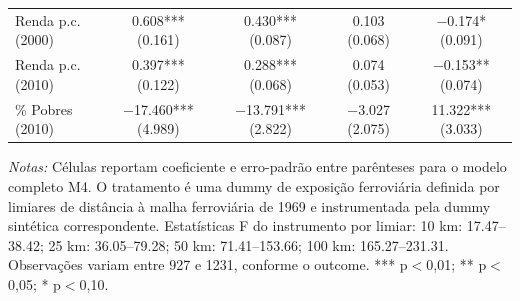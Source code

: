 \documentclass[12pt,a4paper]{article}
\begin{document}
\begin{table}[!htbp]
{\begin{tabular}{lcccc}
Renda p.c. (2000) & \num{0.608}*** (\num{0.161}) & \num{0.430}*** (\num{0.087}) & \num{0.103} (\num{0.068}) & \num{-0.174}* (\num{0.091}) \\
Renda p.c. (2010) & \num{0.397}*** (\num{0.122}) & \num{0.288}*** (\num{0.068}) & \num{0.074} (\num{0.053}) & \num{-0.153}** (\num{0.074}) \\
\% Pobres (2010) & \num{-17.460}*** (\num{4.989}) & \num{-13.791}*** (\num{2.822}) & \num{-3.027} (\num{2.075}) & \num{11.322}*** (\num{3.033}) \\
\bottomrule
\end{tabular}}
\begin{minipage}{0.96\textwidth}
\scriptsize \textit{Notas:} Células reportam coeficiente e erro-padrão entre parênteses para o modelo completo M4. O tratamento é uma dummy de exposição ferroviária definida por limiares de distância à malha ferroviária de 1969 e instrumentada pela dummy sintética correspondente. Estatísticas F do instrumento por limiar: 10 km: 17.47--38.42; 25 km: 36.05--79.28; 50 km: 71.41--153.66; 100 km: 165.27--231.31. Observações variam entre 927 e 1231, conforme o outcome. *** p$<$0,01; ** p$<$0,05; * p$<$0,10.
\end{minipage}
\end{table}
\end{document}
